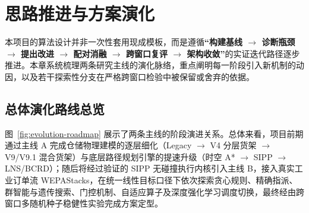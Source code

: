 \section{思路推进与方案演化}
\label{sec:evolution}

本项目的算法设计并非一次性套用现成模板，而是遵循\textbf{“构建基线 $\rightarrow$ 诊断瓶颈 $\rightarrow$ 提出改进 $\rightarrow$ 配对消融 $\rightarrow$ 跨窗口复评 $\rightarrow$ 架构收敛”}的实证迭代路径逐步推进。本章系统梳理两条研究主线的演化脉络，重点阐明每一阶段引入新机制的动因，以及若干探索性分支在严格跨窗口检验中被保留或舍弃的依据。

\subsection{总体演化路线总览}

图~\ref{fig:evolution-roadmap} 展示了两条主线的阶段演进关系。总体来看，项目前期通过主线 A 完成仓储物理建模的逐层细化（Legacy $\rightarrow$ V4 分层货架 $\rightarrow$ V9/V9.1 混合货架）与底层路径规划引擎的提速升级（时空 A* $\rightarrow$ SIPP $\rightarrow$ LNS/BCRD）；随后将经过验证的 SIPP 无碰撞执行内核引入主线 B，接入真实工业订单流 WEPAStacks，在统一线性目标口径下依次探索贪心规则、精确指派、群智能与遗传搜索、门控机制、自适应算子及深度强化学习调度切换，最终经由跨窗口多随机种子稳健性实验完成方案定型。


